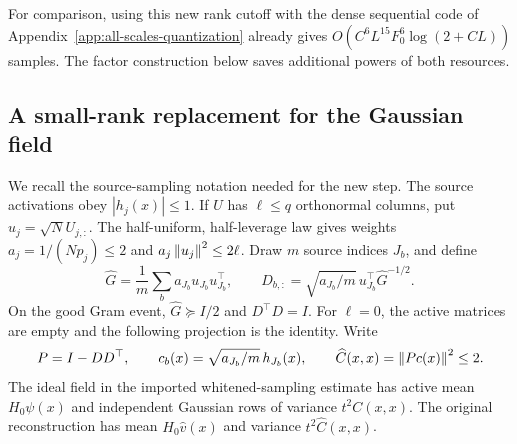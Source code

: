 For comparison, using this new rank cutoff with the dense sequential code
of Appendix~\ref{app:all-scales-quantization} already gives
$O(C^6L^{15}F_0^6\log(2+CL))$ samples. The factor construction below saves
additional powers of both resources.

\subsection{A small-rank replacement for the Gaussian field}

We recall the source-sampling notation needed for the new step.
The source activations obey $|h_j(x)|\le1$. If $U$ has $\ell\le q$
orthonormal columns, put $u_j=\sqrt N U_{j,:}$. The half-uniform,
half-leverage law gives weights $a_j=1/(Np_j)\le2$ and
$a_j\left\|u_j\right\|^2\le2\ell$. Draw $m$ source indices $J_b$, and define
\[
 \widehat G=\frac1m\sum_ba_{J_b}u_{J_b}u_{J_b}^{\top},\qquad
 D_{b,:}=\sqrt{a_{J_b}/m}\,u_{J_b}^{\top}\widehat G^{-1/2}.
\]
On the good Gram event, $\widehat G\succeq I/2$ and $D^\top D=I$.
For $\ell=0$, the active matrices are empty and the following projection
is the identity. Write
\[
 P=I-DD^\top,\qquad
 c_b(x)=\sqrt{a_{J_b}/m}\,h_{J_b}(x),\qquad
 \widehat C(x,x)=\left\|Pc(x)\right\|^2\le2.
\]
The ideal field in the imported whitened-sampling estimate has active mean
$H_0\psi(x)$ and independent Gaussian rows of variance $t^2C(x,x)$.
The original reconstruction has mean $H_0\widehat v(x)$ and variance
$t^2\widehat C(x,x)$.

